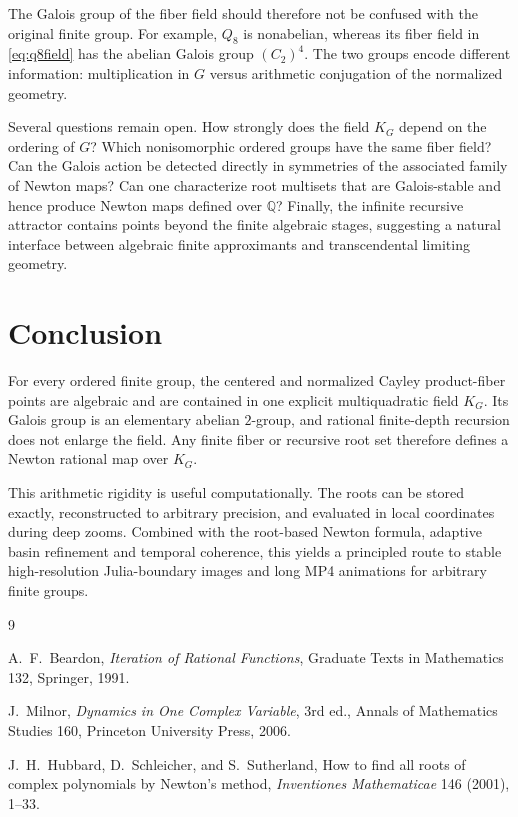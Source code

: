\documentclass[11pt,a4paper]{article}
\theoremstyle{definition}
\newcommand{\Q}{\mathbb{Q}}
\begin{document}
The Galois group of the fiber field should therefore not be confused with the original finite group.  For example, $Q_8$ is nonabelian, whereas its fiber field in \eqref{eq:q8field} has the abelian Galois group $(C_2)^4$.  The two groups encode different information: multiplication in $G$ versus arithmetic conjugation of the normalized geometry.

Several questions remain open.  How strongly does the field $K_G$ depend on the ordering of $G$?  Which nonisomorphic ordered groups have the same fiber field?  Can the Galois action be detected directly in symmetries of the associated family of Newton maps?  Can one characterize root multisets that are Galois-stable and hence produce Newton maps defined over $\Q$?  Finally, the infinite recursive attractor contains points beyond the finite algebraic stages, suggesting a natural interface between algebraic finite approximants and transcendental limiting geometry.

\section{Conclusion}

For every ordered finite group, the centered and normalized Cayley product-fiber points are algebraic and are contained in one explicit multiquadratic field $K_G$.  Its Galois group is an elementary abelian $2$-group, and rational finite-depth recursion does not enlarge the field.  Any finite fiber or recursive root set therefore defines a Newton rational map over $K_G$.

This arithmetic rigidity is useful computationally.  The roots can be stored exactly, reconstructed to arbitrary precision, and evaluated in local coordinates during deep zooms.  Combined with the root-based Newton formula, adaptive basin refinement and temporal coherence, this yields a principled route to stable high-resolution Julia-boundary images and long MP4 animations for arbitrary finite groups.

\begin{thebibliography}{9}

A.~F.~Beardon,
\emph{Iteration of Rational Functions},
Graduate Texts in Mathematics 132, Springer, 1991.

J.~Milnor,
\emph{Dynamics in One Complex Variable}, 3rd ed.,
Annals of Mathematics Studies 160, Princeton University Press, 2006.

J.~H.~Hubbard, D.~Schleicher, and S.~Sutherland,
How to find all roots of complex polynomials by Newton's method,
\emph{Inventiones Mathematicae} 146 (2001), 1--33.

\end{thebibliography}
\end{document}
